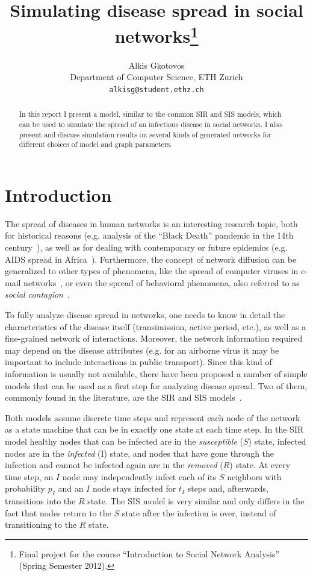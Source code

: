 \documentclass[11pt]{article} %
\title{Simulating disease spread in social networks\thanks{Final project
for the course ``Introduction to Social Network Analysis'' (Spring
Semester 2012).}}
\author{
Alkis Gkotovos\\
Department of Computer Science, ETH Zurich\\
\texttt{alkisg@student.ethz.ch}
}
\begin{document}
\maketitle

\begin{abstract}
In this report I present a model, similar to the common SIR and SIS models,
which can be used to simulate the spread of an infectious disease in
social networks. I also present and discuss simulation results on several
kinds of generated networks for different choices of model and graph parameters.
\end{abstract}

\section{Introduction}
The spread of diseases in human networks is an interesting research topic, both
for historical reasons (e.g. analysis of the ``Black Death'' pandemic in the
14th century~\cite{blackdeath}), as well as for dealing with contemporary or
future epidemics (e.g. AIDS spread in Africa~\cite{aids}). Furthermore, the
concept of network diffusion can be generalized to other types of phenomena,
like the spread of computer viruses in e-mail networks~\cite{email}, or even
the spread of behavioral phenomena, also referred to as
\emph{social contagion}~\cite{contagion}.

To fully analyze disease spread in networks, one needs to know in detail the
characteristics of the disease itself (transimission, active period, etc.),
as well as a fine-grained network of interactions. Moreover, the network
information required may depend on the disease attributes (e.g. for an airborne virus
it may be important to include interactions in public transport). Since this
kind of information is usually not available, there have been proposed a
number of simple models that can be used as a first step for analyzing disease
spread. Two of them, commonly found in the literature, are the SIR and SIS
models~\cite{easley, newman}.

Both models assume discrete time steps and represent each node of the network
as a state machine that can be in exactly one state at each time step. In the
SIR model healthy nodes that can be infected are in the \emph{susceptible} ($S$)
state, infected nodes are in the \emph{infected} (I) state, and nodes that have
gone through the infection and cannot be infected again are in the \emph{removed}
($R$) state. At every time step, an $I$ node may independently infect each of
its $S$ neighbors with probability $p_I$ and an $I$ node stays infected for
$t_I$ steps and, afterwards, transitions into the $R$ state.
The SIS model is very similar and only differs in the fact that nodes return
to the $S$ state after the infection is over, instead of transitioning to the
$R$ state.
\end{document}
